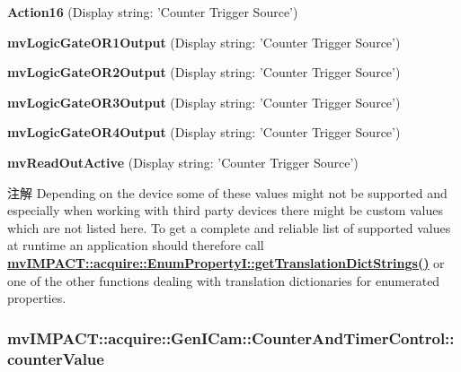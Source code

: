 \begin{DoxyItemize}
\item {\bfseries Action16} (Display string\+: 'Counter Trigger Source')
\item {\bfseries mv\+Logic\+Gate\+O\+R1\+Output} (Display string\+: 'Counter Trigger Source')
\item {\bfseries mv\+Logic\+Gate\+O\+R2\+Output} (Display string\+: 'Counter Trigger Source')
\item {\bfseries mv\+Logic\+Gate\+O\+R3\+Output} (Display string\+: 'Counter Trigger Source')
\item {\bfseries mv\+Logic\+Gate\+O\+R4\+Output} (Display string\+: 'Counter Trigger Source')
\item {\bfseries mv\+Read\+Out\+Active} (Display string\+: 'Counter Trigger Source')
\end{DoxyItemize}

\begin{DoxyNote}{注解}
Depending on the device some of these values might not be supported and especially when working with third party devices there might be custom values which are not listed here. To get a complete and reliable list of supported values at runtime an application should therefore call {\bfseries \hyperlink{classmv_i_m_p_a_c_t_1_1acquire_1_1_enum_property_i_a0ba6ccbf5ee69784d5d0b537924d26b6}{mv\+I\+M\+P\+A\+C\+T\+::acquire\+::\+Enum\+Property\+I\+::get\+Translation\+Dict\+Strings()}} or one of the other functions dealing with translation dictionaries for enumerated properties. 
\end{DoxyNote}
\hypertarget{classmv_i_m_p_a_c_t_1_1acquire_1_1_gen_i_cam_1_1_counter_and_timer_control_aa20aa23c911bdf08578a68724c5d52c3}{
\subsubsection[{counter\+Value}]{ mv\+I\+M\+P\+A\+C\+T\+::acquire\+::\+Gen\+I\+Cam\+::\+Counter\+And\+Timer\+Control\+::counter\+Value}}\label{classmv_i_m_p_a_c_t_1_1acquire_1_1_gen_i_cam_1_1_counter_and_timer_control_aa20aa23c911bdf08578a68724c5d52c3}


